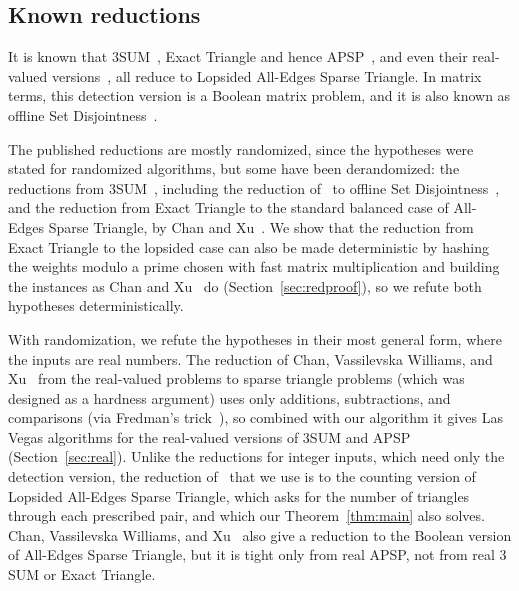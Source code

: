 \subsection{Known reductions} \label{Sec:introknown}
It is known that $3$SUM~\cite{Pat10,KPP16}, Exact Triangle and hence APSP~\cite{VX20a}, and even their real-valued versions~\cite{CVX22}, all reduce to Lopsided All-Edges Sparse Triangle. In matrix terms, this detection version is a Boolean matrix problem, and it is also known as offline Set Disjointness~\cite{KPP16,VX20a}. 

The published reductions are mostly randomized, since the hypotheses were stated for randomized algorithms, but some have been derandomized: the reductions from $3$SUM~\cite{CH20,FKP24}, including the reduction of~\cite{KPP16} to offline Set Disjointness~\cite[Theorem~1.4]{FKP24}, and the reduction from Exact Triangle to the standard balanced case of All-Edges Sparse Triangle, by Chan and Xu~\cite{CX24}. We show that the reduction from Exact Triangle to the lopsided case can also be made deterministic by hashing the weights modulo a prime chosen with fast matrix multiplication and building the instances as Chan and Xu~\cite{CX24} do (Section~\ref{sec:redproof}), so we refute both hypotheses deterministically.

With randomization, we refute the hypotheses in their most general form, 
where the inputs are real numbers.
 The reduction of Chan, Vassilevska Williams, and Xu~\cite{CVX22} from the real-valued
  problems to sparse triangle problems (which was designed as a hardness argument) uses 
  only additions, subtractions, and comparisons (via Fredman's trick~\cite{Fre76}), 
  so combined with our algorithm it gives Las Vegas algorithms for the real-valued 
  versions of $3$SUM and APSP (Section~\ref{sec:real}). Unlike the reductions for 
  integer inputs, which need only the detection version, the reduction of~\cite{CVX22} 
  that we use is to the counting version of Lopsided All-Edges Sparse Triangle, which 
  asks for the number of triangles through each prescribed pair, and which our 
  Theorem~\ref{thm:main} also solves. Chan, Vassilevska Williams, and Xu~\cite{CVX22} 
  also give a reduction to the Boolean version of All-Edges Sparse Triangle, but it is
   tight only from real APSP, not from real $3$SUM or Exact Triangle.

